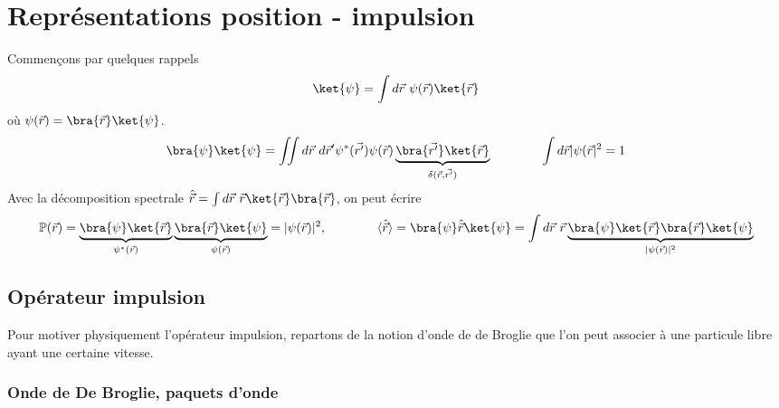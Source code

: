 \chapter{Représentations position - impulsion}
Commençons par quelques rappels
\begin{equation}
\ket{\psi} = \int d\vec r\ \psi(\vec{r})\ket{\vec{r}}
\end{equation}
où $\psi(\vec{r}) = \bra{\vec{r}}\ket{\psi}$.
\begin{equation}
\bra{\psi}\ket{\psi} = \iint d\vec r\ d\vec r'\psi^*(\vec{r'})\psi(\vec{r})\underbrace{
\bra{\vec{r'}}\ket{\vec{r}}}_{\delta(\vec{r},\vec{r'})}\qquad\qquad \int d\vec r |\psi(\vec{r}|^2=1
\end{equation}
Avec la décomposition spectrale $\hat{\vec{r}} = \int d\vec{r}\ \vec{r}\ket{\vec{r}}\bra{\vec{r}}$, 
on peut écrire
\begin{equation}
\mathbb{P}(\vec{r}) = \underbrace{\bra{\psi}\ket{\vec{r}}}_{\psi^*(\vec{r})}\underbrace{
\bra{\vec{r}}\ket{\psi}}_{\psi(\vec{r})} = |\psi(\vec{r})|^2,\qquad\qquad\langle\hat{\vec{r}}\rangle = 
\bra{\psi}\hat{\vec{r}}\ket{\psi} = \int d\vec{r}\ \vec{r}\underbrace{\bra{\psi}\ket{\vec{r}}
\bra{\vec{r}}\ket{\psi}}_{|\psi(\vec{r})|^2}
\end{equation}

\section{Opérateur impulsion}
Pour motiver physiquement l'opérateur impulsion, repartons de la notion d'onde de de Broglie que 
l'on peut associer à une particule libre ayant une certaine vitesse. 
\subsection{Onde de De Broglie, paquets d'onde}
